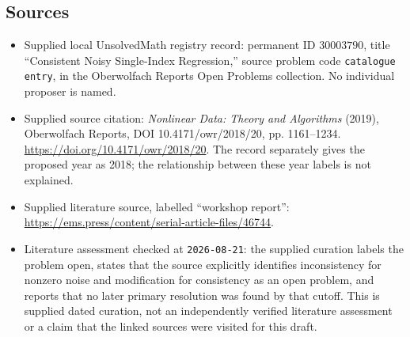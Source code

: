 \documentclass[11pt]{article}
\begin{document}
\subsection{Sources}
\begin{itemize}
\item Supplied local UnsolvedMath registry record: permanent ID \(30003790\), title ``Consistent Noisy Single-Index Regression,'' source problem code \texttt{catalogue entry}, in the Oberwolfach Reports Open Problems collection. No individual proposer is named.
\item Supplied source citation: \emph{Nonlinear Data: Theory and Algorithms} (2019), Oberwolfach Reports, DOI 10.4171/owr/2018/20, pp. 1161--1234. \url{https://doi.org/10.4171/owr/2018/20}. The record separately gives the proposed year as 2018; the relationship between these year labels is not explained.
\item Supplied literature source, labelled ``workshop report'': \url{https://ems.press/content/serial-article-files/46744}.
\item Literature assessment checked at \texttt{2026-08-21}: the supplied curation labels the problem open, states that the source explicitly identifies inconsistency for nonzero noise and modification for consistency as an open problem, and reports that no later primary resolution was found by that cutoff. This is supplied dated curation, not an independently verified literature assessment or a claim that the linked sources were visited for this draft.
\end{itemize}
\end{document}

